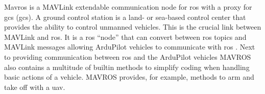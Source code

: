 
Mavros is a MAVLink extendable communication node for \acs{ros} with a proxy for \acs{gcs} (\acl{gcs}). A ground control station 
is a land- or sea-based control center that provides the ability to control unmanned vehicles.
This is the crucial link between MAVLink and \acs{ros}. It is a \acs{ros} “node” that can convert between \acs{ros} topics and
MAVLink messages allowing ArduPilot vehicles to communicate with \acs{ros} \cite{mavros:wiki}. Next to providing communication 
between \acs{ros} and the ArduPilot vehicles MAVROS also contains a multitude of builtin methods to simplify coding when handling
basic actions of a vehicle. MAVROS provides, for example, methods to arm and take off with a \acs{uav}.

